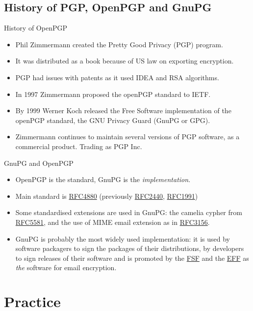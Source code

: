 \documentclass[hyperref={colorlinks=true}]{beamer}
\begin{document}
\subsection{History of PGP, OpenPGP and GnuPG}
\begin{frame}{History of OpenPGP}
  \begin{itemize}
    \item Phil Zimmermann created the Pretty Good Privacy (PGP) program.
    \item It was distributed as a book because of US law on exporting
encryption.
    \item PGP had issues with patents as it used IDEA and RSA algorithms.
    \item In 1997 Zimmermann proposed the openPGP standard to IETF.
    \item By 1999 Werner Koch released the Free Software implementation of the
openPGP standard, the GNU Privacy Guard (GnuPG or GPG).
    \item Zimmermann continues to maintain several versions of PGP software, as
a commercial product.  Trading as PGP Inc.
  \end{itemize}
\end{frame}

\begin{frame}{GnuPG and OpenPGP}
  \begin{itemize}
    \item OpenPGP is the standard, GnuPG is the \emph{implementation}.
    \item Main standard is
\href{https://tools.ietf.org/html/rfc4880}{RFC4880} (previously
\href{https://tools.ietf.org/html/rfc2440}{RFC2440},
\href{https://tools.ietf.org/html/rfc1991}{RFC1991})
    \item Some standardised extensions are used in GnuPG: the camelia cypher
from \href{https://tools.ietf.org/html/rfc5581}{RFC5581}, and the use of MIME
email extension as in \href{https://tools.ietf.org/html/rfc3156}{RFC3156}.
    \item GnuPG is probably the most widely used implementation: it is used by
software packagers to sign the packages of their distributions, by developers
to sign releases of their software and is promoted by the
\href{http://www.fsf.org/}{FSF} and the \href{http://www.eff.org}{EFF} as
\emph{the} software for email encryption.
  \end{itemize}
\end{frame}

\section{Practice}
\end{document}
